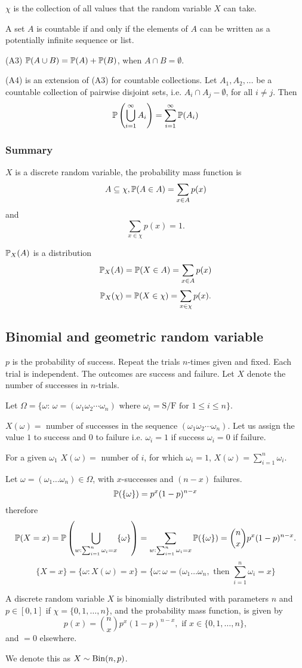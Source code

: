 \documentclass[10pt, a4paper]{article}
\begin{document}
$\chi$ is the collection of all values that the random variable $X$ can take.

A set $A$ is countable if and only if the elements of $A$ can be written as a potentially infinite sequence or list.

(A3) $\P(A \cup B) = \P(A) + \P(B)$, when $A \cap B = \emptyset$.

(A4) is an extension of (A3) for countable collections.
Let $A_1, A_2, \dotsc$ be a countable collection of pairwise disjoint sets,
i.e. $A_i \cap A_j - \emptyset$, for all $i \neq j$.
Then
\[
\P\left(\bigcup_{i = 1}^{\infty}A_i\right) = \sum_{i = 1}^{\infty}\P(A_i)
\]

\subsubsection{Summary}
$X$ is a discrete random variable,
the probability mass function is
\[
A \subseteq \chi, \P(A \in A) = \sum_{x \in A}p(x)
\]
and
\[
\sum_{x \in \chi}p(x) = 1.
\]

$\P_X(A)$ is a distribution
\[
\P_X(A) = \P(X \in A) = \sum_{x \in A}p(x)
\]
\[
\P_X(\chi) = \P(X \in \chi) = \sum_{x \in \chi}p(x).
\]

\subsection{Binomial and geometric random variable}
$p$ is the probability of success.
Repeat the trials $n$-times given and fixed.
Each trial is independent.
The outcomes are success and failure.
Let $X$ denote the number of successes in $n$-trials.

Let $\Omega = \{\omega:\, \omega = (\omega_1\omega_2\dotsi\omega_n) \text{ where } \omega_i = \text{S/F for } 1 \leq i \leq n\}$.

$X(\omega) = $ number of successes in the sequence $(\omega_1\omega_2\dotsi\omega_n)$.
Let us assign the value $1$ to success and $0$ to failure i.e. $\omega_i = 1$ if success $\omega_i = 0$ if failure.

For a given $\omega_1$
$X(\omega) = $ number of $i$, for which $\omega_i = 1$, $X(\omega) = \sum_{i = 1}^{n}\omega_i$.

Let $\omega = (\omega_1\dotsc \omega_n) \in \Omega$,
with $x$-successes and $(n - x)$ failures.
\[
\P(\{\omega\}) = p ^ x (1 - p) ^ {n - x}
\]
therefore
\[
\P(X = x) = \P\left(\bigcup_{w : \sum_{i = 1}^n\omega_i = x}\{\omega\}\right) = \sum_{w : \sum_{i = 1}^n\omega_i = x}\P(\{\omega\}) = \binom{n}{x}p ^ x (1 - p) ^ {n - x}.
\]
\[
\{X = x\} = \{\omega : X(\omega) = x\} = \{\omega : \omega = (\omega_1\dotsc \omega_n,\text{ then } \sum_{i = 1}^n\omega_i = x\}
\]
\begin{definition}
    A discrete random variable $X$ is binomially distributed with parameters $n$ and $p \in [0, 1]$ if $\chi = \{0, 1, \dotsc, n\}$,
    and the probability mass function,
    is given by
    \[
    p(x) = \binom{n}{x}p ^ x(1 - p) ^ {n - x},\text{ if } x \in \{0, 1, \dotsc, n\},
    \]
    and $= 0$ elsewhere.

    We denote this as
    $X \sim \Bin(n, p)$.
\end{definition}
\end{document}
